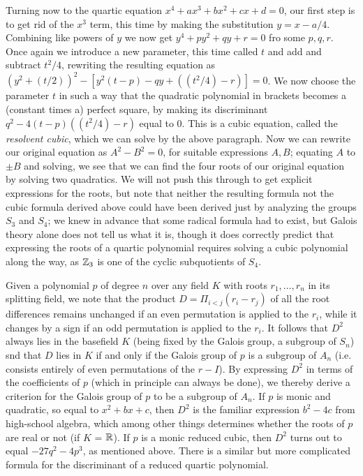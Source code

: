 \documentclass[10pt]{article}
\begin{document}
Turning now to the quartic equation $x^4 + ax^3 + bx^2 + cx + d = 0$,
our first step is to get rid of the $x^3$ term, this time by making the
substitution $y = x - a/4$. Combining like powers of $y$ we now get $y^4
+ py^2 + qy + r = 0$ fro some $p,q,r$. Once again we introduce a new
parameter, this time called $t$ and add and subtract $t^2/4$, rewriting
the resulting equation as $(y^2 + (t/2))^2 - [y^2(t-p) - qy + ((t^2/4) -
  r)] = 0$. We now choose the parameter $t$ in such a way that the
quadratic polynomial in brackets becomes a (constant times a) perfect
square, by making its discriminant $q^2 - 4(t-p)((t^2/4) - r)$ equal to
0. This is a cubic equation, called the {\sl resolvent cubic}, which we
can solve by the above paragraph. Now we can rewrite our original
equation as $A^2 - B^2 = 0$, for suitable expressions $A,B$; equating
$A$ to $\pm B$ and solving, we see that we can find the four roots of
our original equation by solving two quadratics. We will not push this
through to get explicit expressions for the roots, but note that neither
the resulting formula not the cubic formula derived above could have
been derived just by analyzing the groups $S_3$ and $S_4$; we knew in
advance that some radical formula had to exist, but Galois theory alone
does not tell us what it is, though it does correctly predict that
expressing the roots of a quartic polynomial requires solving a cubic
polynomial along the way, as $\Bbb Z_3$ is one of the cyclic
subquotients of $S_4$.

Given a polynomial $p$ of degree $n$ over any field $K$ with roots
$r_1,\ldots,r_n$ in its splitting field, we note that the product
$D=\Pi_{i<j} (r_i - r_j)$ of all the root differences remains unchanged
if an even permutation is applied to the $r_i$, while it changes by a
sign if an odd permutation is applied to the $r_i$. It follows that
$D^2$ always lies in the basefield $K$ (being fixed by the Galois group,
a subgroup of $S_n$) snd that $D$ lies in $K$ if and only if the Galois
group of $p$ is a subgroup of $A_n$ (i.e. consists entirely of even
permutations of the $r-I$). By expressing $D^2$ in terms of the
coefficients of $p$ (which in principle can always be done), we thereby
derive a criterion for the Galois group of $p$ to be a subgroup of
$A_n$. If $p$ is monic and quadratic, so equal to $x^2 + bx + c$, then
$D^2$ is the familiar expression $b^2 - 4c$ from high-school algebra,
which among other things determines whether the roots of $p$ are real or
not (if $K$ = $\Bbb R$). If $p$ is a monic reduced cubic, then $D^2$
turns out to equal $-27q^2 - 4p^3$, as mentioned above. There is a
similar but more complicated formula for the discriminant of a reduced
quartic polynomial.
\end{document}

